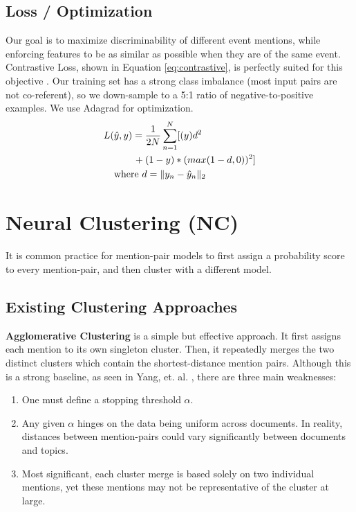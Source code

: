 \documentclass[11pt,a4paper]{article}
\begin{document}
\subsection{Loss / Optimization}
Our goal is to maximize discriminability of different event mentions, while enforcing features to be as similar as possible when they are of the same event.  Contrastive Loss, shown in Equation \ref{eq:contrastive}, is perfectly suited for this objective \cite{SchroffKP15,pmlr-v48-liud16}. Our training set has a strong class imbalance (most input pairs are not co-referent), so we down-sample to a 5:1 ratio of negative-to-positive examples.  We use Adagrad for optimization.
\begin{equation}
\begin{aligned}
L(&\hat{y},y)=\frac{1}{2N}\sum_{n=1}^{N}[(y)d^2 \\
&\qquad {} + (1-y)*(max(1-d,0))^2] \\
&\textnormal{where }d=\|y_{n}-\hat{y}_{n}\|_{2}
\end{aligned}
\label{eq:contrastive}
\end{equation}


\section{Neural Clustering (NC)}
\label{sec:clustering}
It is common practice for mention-pair models to first assign a probability score to every mention-pair, and then cluster with a different model.

\subsection{Existing Clustering Approaches}
\textbf{Agglomerative Clustering} is a simple but effective approach.  It first assigns each mention to its own singleton cluster.  Then, it repeatedly merges the two distinct clusters which contain the shortest-distance mention pairs.  Although this is a strong baseline, as seen in Yang, et. al. , there are three main weaknesses:
\begin{enumerate}
\item One must define a stopping threshold $\alpha$.
\item Any given $\alpha$ hinges on the data being uniform across documents.  In reality, distances between mention-pairs could vary significantly between documents and topics.
\item Most significant, each cluster merge is based solely on two individual mentions, yet these mentions may not be representative of the cluster at large.
\end{enumerate}
\end{document}
